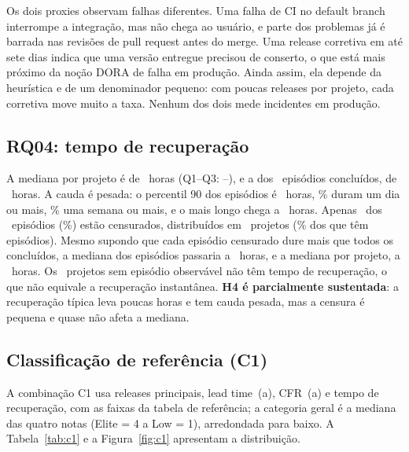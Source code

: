 Os dois proxies observam falhas diferentes. Uma falha de CI no default branch interrompe
a integração, mas não chega ao usuário, e parte dos problemas já é barrada nas revisões
de pull request antes do merge. Uma release corretiva em até sete dias indica que uma
versão entregue precisou de conserto, o que está mais próximo da noção DORA de falha em
produção. Ainda assim, ela depende da heurística e de um denominador pequeno: com poucas
releases por projeto, cada corretiva move muito a taxa. Nenhum dos dois mede incidentes
em produção.

\subsection{RQ04: tempo de recuperação}

A mediana por projeto é de \labARecMediana\ horas (Q1--Q3: \labARecQUm--\labARecQTres),
e a dos \labAEpN\ episódios concluídos, de \labAEpMediana\ horas. A cauda é pesada: o
percentil 90 dos episódios é \labAEpPNoventa\ horas, \labAEpDiaPct\% duram um dia ou
mais, \labAEpSemanaPct\% uma semana ou mais, e o mais longo chega a \labAEpMaximo\ horas.
Apenas \labAEpCensurados\ dos \labAEpTotal\ episódios (\labAEpCensuradosPct\%) estão
censurados, distribuídos em \labARepoCensura\ projetos (\labARepoCensuraPct\% dos que
têm episódios). Mesmo supondo que cada episódio censurado dure mais que todos os
concluídos, a mediana dos episódios passaria a \labAEpPiorCaso\ horas, e a mediana por
projeto, a \labARecPiorCaso\ horas. Os \labARepoSemEpisodios\ projetos sem episódio
observável não têm tempo de recuperação, o que não equivale a recuperação instantânea.
\textbf{H4 é parcialmente sustentada}: a recuperação típica leva poucas horas e tem cauda
pesada, mas a censura é pequena e quase não afeta a mediana.

\subsection{Classificação de referência (C1)}

A combinação C1 usa releases principais, lead time~(a), CFR~(a) e tempo de recuperação,
com as faixas da tabela de referência; a categoria geral é a mediana das quatro notas
(Elite = 4 a Low = 1), arredondada para baixo. A Tabela~\ref{tab:c1} e a
Figura~\ref{fig:c1} apresentam a distribuição.

\begin{table}[htbp]
\centering\footnotesize
\caption{Classificação C1 por métrica e geral (porcentagem sobre 300 projetos). A última
linha é uma sensibilidade que aceita três métricas.}
\label{tab:c1}

\end{table}


